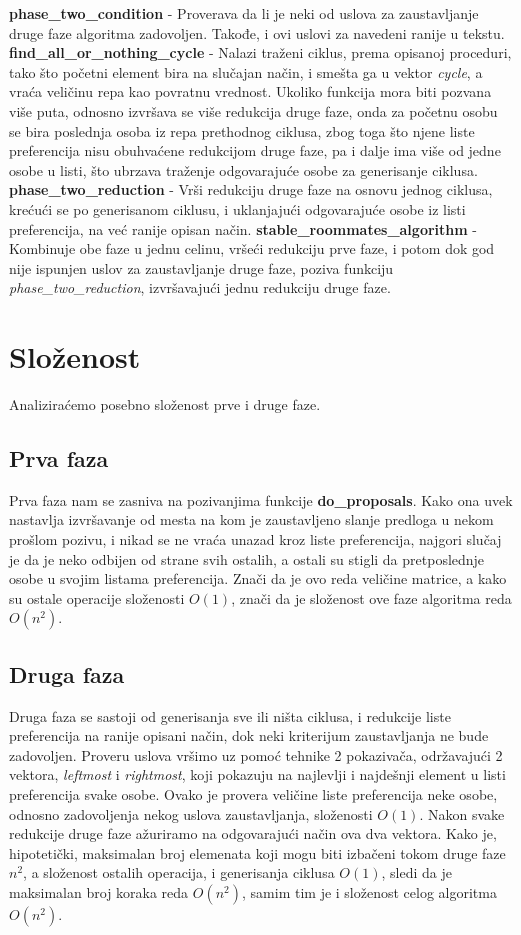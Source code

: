 \documentclass[a4paper]{article}
\begin{document}
\textbf{phase\_two\_condition} - Proverava da li je neki od uslova za zaustavljanje druge faze algoritma zadovoljen. Takođe, i ovi uslovi za navedeni ranije u tekstu.
\newline
\textbf{find\_all\_or\_nothing\_cycle} - Nalazi traženi ciklus, prema opisanoj proceduri, tako što početni element bira na slučajan način, i smešta ga u vektor \textit{cycle}, a vraća veličinu repa kao povratnu vrednost. Ukoliko funkcija mora biti pozvana više puta, odnosno izvršava se više redukcija druge faze, onda za početnu osobu se bira poslednja osoba iz repa prethodnog ciklusa, zbog toga što njene liste preferencija nisu obuhvaćene redukcijom druge faze, pa i dalje ima više od jedne osobe u listi, što ubrzava traženje odgovarajuće osobe za generisanje ciklusa.
\newline
\textbf{phase\_two\_reduction} - Vrši redukciju druge faze na osnovu jednog ciklusa, krećući se po generisanom ciklusu, i uklanjajući odgovarajuće osobe iz listi preferencija, na već ranije opisan način.
\newline
\textbf{stable\_roommates\_algorithm} - Kombinuje obe faze u jednu celinu, vršeći redukciju prve faze, i potom dok god nije ispunjen uslov za zaustavljanje druge faze, poziva funkciju \textit{phase\_two\_reduction}, izvršavajući jednu redukciju druge faze.

\section{Složenost}
Analiziraćemo posebno složenost prve i druge faze.
\subsection{Prva faza}
Prva faza nam se zasniva na pozivanjima funkcije \textbf{do\_proposals}. Kako ona uvek nastavlja izvršavanje od mesta na kom je zaustavljeno slanje predloga u nekom prošlom pozivu, i nikad se ne vraća unazad kroz liste preferencija, najgori slučaj je da je neko odbijen od strane svih ostalih, a ostali su stigli da pretposlednje osobe u svojim listama preferencija. Znači da je ovo reda veličine matrice, a kako su ostale operacije složenosti $O(1)$, znači da je složenost ove faze algoritma reda $O(n^2)$.
\subsection{Druga faza}
Druga faza se sastoji od generisanja sve ili ništa ciklusa, i redukcije liste preferencija na ranije opisani način, dok neki kriterijum zaustavljanja ne bude zadovoljen. Proveru uslova vršimo uz pomoć tehnike 2 pokazivača, održavajući 2 vektora, \textit{leftmost} i \textit{rightmost}, koji pokazuju na najlevlji i najdešnji element u listi preferencija svake osobe. Ovako je provera veličine liste preferencija neke osobe, odnosno zadovoljenja nekog uslova zaustavljanja, složenosti $O(1)$. Nakon svake redukcije druge faze ažuriramo na odgovarajući način ova dva vektora. Kako je, hipotetički, maksimalan broj elemenata koji mogu biti izbačeni tokom druge faze $n^2$, a složenost ostalih operacija, i generisanja ciklusa $O(1)$, sledi da je maksimalan broj koraka reda $O(n^2)$, samim tim je i složenost celog algoritma $O(n^2)$.
\end{document}

